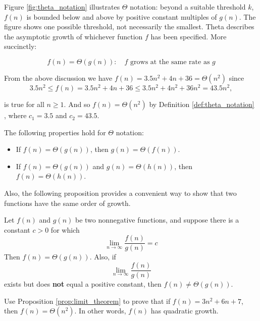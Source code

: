 Figure \ref{fig:theta_notation} illustrates $\Theta$ notation: beyond a suitable threshold $k$, $f(n)$ is bounded below and above by positive constant multiples of $g(n)$. The figure shows one possible threshold, not necessarily the smallest. Theta describes the asymptotic growth of whichever function $f$ has been specified. More succinctly:

\[
f(n)=\Theta(g(n)): \quad f \text { grows at the same rate as } g
\]

\begin{example}

    From the above discussion we have $f(n)=3.5 n^2+4 n+36=\Theta\left(n^2\right)$ since
    \[
    3.5 n^2 \leq f(n)=3.5 n^2+4 n+36 \leq 3.5 n^2+4 n^2+36 n^2=43.5 n^2,
    \]

is true for all $n \geq 1$. And so $f(n)=\Theta\left(n^2\right)$ by Definition \ref{def:theta_notation} , where $c_1=3.5$ and $c_2=43.5$.
\end{example}

The following properties hold for $\Theta$ notation:

\begin{itemize}
    \item If $f(n) = \Theta(g(n))$, then $g(n) = \Theta(f(n))$.
    \item If $f(n) = \Theta(g(n))$ and $g(n) = \Theta(h(n))$, then $f(n) = \Theta(h(n))$.
\end{itemize}

Also, the following proposition provides a convenient way to show that two functions have the same
order of growth.

\begin{proposition} \label{prop:limit_theorem}
    Let $f(n)$ and $g(n)$ be two nonnegative functions, and suppose there is a constant $c>0$ for which
    \medskip
    \[
    \lim _{n \rightarrow \infty} \frac{f(n)}{g(n)}=c
    \]
    \medskip
    Then $f(n)=\Theta(g(n))$. Also, if
    \medskip
    \[
    \lim _{n \rightarrow \infty} \frac{f(n)}{g(n)}
    \]
    \medskip
    exists but does \textbf{not} equal a positive constant, then $f(n) \neq \Theta(g(n))$.
\end{proposition}

\begin{example}
    Use Proposition \ref{prop:limit_theorem} to prove that if $f(n)=3 n^2+6 n+7$, then $f(n)=\Theta\left(n^2\right)$. In other words, $f(n)$ has quadratic growth.
\end{example}

